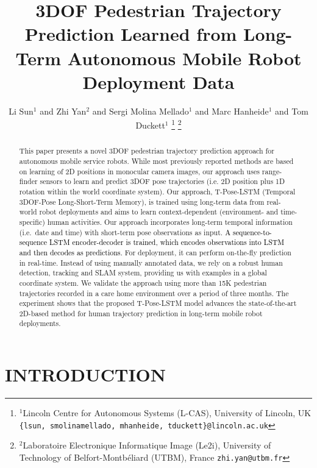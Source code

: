 \documentclass[letterpaper, 10 pt, conference]{ieeeconf}  %
\title{\LARGE \bf
3DOF Pedestrian Trajectory Prediction Learned from Long-Term Autonomous Mobile Robot Deployment Data}
\author{Li Sun$^{1}$ and Zhi Yan$^{2}$ and Sergi Molina Mellado$^{1}$ and Marc Hanheide$^{1}$ and Tom Duckett$^{1}$%
  \thanks{$^{1}$Lincoln Centre for Autonomous Systems (L-CAS), University of Lincoln, UK
    {\tt\small \{lsun, smolinamellado, mhanheide, tduckett\}@lincoln.ac.uk}}%
  \thanks{$^{2}$Laboratoire Electronique Informatique Image (Le2i), University of Technology of Belfort-Montb\'eliard (UTBM), France
    {\tt\small zhi.yan@utbm.fr}}%
}
\newcommand\kevinupdate[1]{\textcolor{black}{#1}}
\begin{document}
\maketitle
\thispagestyle{empty}
\pagestyle{empty}

\begin{abstract}

This paper presents a novel 3DOF pedestrian trajectory prediction approach for autonomous mobile service robots.
While most previously reported methods are based on learning of 2D positions in monocular camera images, our approach uses range-finder sensors to learn and predict 3DOF pose trajectories (i.e. 2D position plus 1D rotation within the world coordinate system).
Our approach, T-Pose-LSTM (Temporal 3DOF-Pose Long-Short-Term Memory), is trained using long-term data from real-world robot deployments and aims to learn context-dependent (environment- and time-specific) human activities. Our approach incorporates long-term temporal information (i.e.~date and time) with short-term pose observations as input. \kevinupdate{A sequence-to-sequence LSTM encoder-decoder is trained, which encodes observations into LSTM and then decodes as predictions.} For deployment, it can perform on-the-fly prediction in real-time. 
Instead of using manually annotated data, we rely on a robust human detection, tracking and SLAM system, providing us with examples in a global coordinate system. 
We validate the approach using more than 15K pedestrian trajectories recorded in a care home environment over a period of three months.
The experiment shows that the proposed T-Pose-LSTM model advances the state-of-the-art 2D-based method for human trajectory prediction in long-term mobile robot deployments.
\end{abstract}


\section{INTRODUCTION}
\label{sec:introduction}
\end{document}
